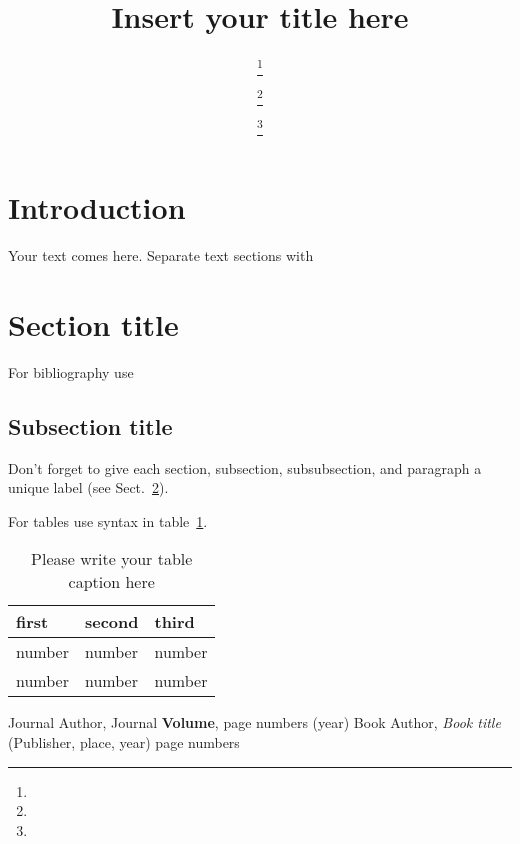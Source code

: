 \documentclass{webofc}
\begin{document}
\title{Insert your title here}

\author{ \fnsep\thanks{} \and
         \fnsep\thanks{} \and
         \fnsep\thanks{}
}



\maketitle

\section{Introduction}
\label{intro}
Your text comes here. Separate text sections with

\section{Section title}
\label{sec-1}
For bibliography use \cite{RefJ}

\subsection{Subsection title}
\label{sec-2}
Don't forget to give each section, subsection, subsubsection, and
paragraph a unique label (see Sect.~\ref{sec-1}).

For tables use syntax in table~\ref{tab-1}.
\begin{table}
\centering
\caption{Please write your table caption here}
\label{tab-1}

\begin{tabular}{lll}
\hline
first & second & third  \\\hline
number & number & number \\
number & number & number \\\hline
\end{tabular}

\vspace*{5cm}
\end{table}

% 
%
%
\begin{thebibliography}{}
%
%
Journal Author, Journal \textbf{Volume}, page numbers (year)
Book Author, \textit{Book title} (Publisher, place, year) page numbers
\end{thebibliography}
\end{document}
